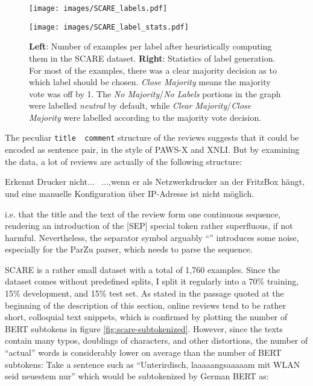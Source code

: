 \begin{figure}
  \begin{minipage}{0.45\linewidth}
  \vspace{0pt}
    \texttt{[image: images/SCARE\_labels.pdf]}
  \end{minipage}
  \hfill
  \begin{minipage}{0.45\linewidth}
  \vspace{0pt}
    \texttt{[image: images/SCARE\_label\_stats.pdf]}
  \end{minipage}
  \caption[Accumulated Gains and Losses.]{\textbf{Left}: Number of examples per label after heuristically computing them in the SCARE dataset. \textbf{Right}: Statistics of label generation. For most of the examples, there was a clear majority decision as to which label should be chosen. \emph{Close Majority} means the majority vote was off by 1. The \emph{No Majority}/\emph{No Labels} portions in the graph were labelled \emph{neutral} by default, while \emph{Clear Majority}/\emph{Close Majority}  were labelled according to the majority vote decision.}
  \label{fig:scare-stats}
\end{figure}


The peculiar \texttt{title \textbar \textbar\ comment} structure of the reviews suggests that it
could be encoded as sentence pair, in the style of PAWS-X and XNLI. But by examining the data, a
lot of reviews are actually of the following structure:

\begin{examples}
  \item Erkennt Drucker nicht... \textbar \textbar\ ...,wenn er als Netzwerkdrucker an der FritzBox hängt, und eine manuelle Konfiguration über IP-Adresse ist nicht möglich.
\end{examples}

i.e. that the title and the text of the review form one continuous sequence, rendering an introduction
of the [SEP] special token rather superfluous, if not harmful. Nevertheless, the
separator symbol arguably ``\textbar \textbar'' introduces some noise, especially for the ParZu
parser, which needs to parse the sequence.



SCARE is a rather small dataset with a total of 1,760 examples. Since the dataset comes
without predefined splits, I split it regularly into a 70\% training, 15\% development,
and 15\% test set. As \citeauthor{sanger2016scare} stated in the passage quoted at the
beginning of the description of this section, online reviews tend to be rather short,
colloquial text snippets, which is confirmed by plotting the number of BERT subtokens in
figure \ref{fig:scare-subtokenized}. However, since the texts contain many typos,
doublings of characters, and other distortions, the number of ``actual'' words is
considerably lower on average than the number of BERT subtokens: Take a sentence such
as ``Unterirdisch, laaaaangsaaaaam mit WLAN seid neuestem nur'' which would be subtokenized by German BERT as:

